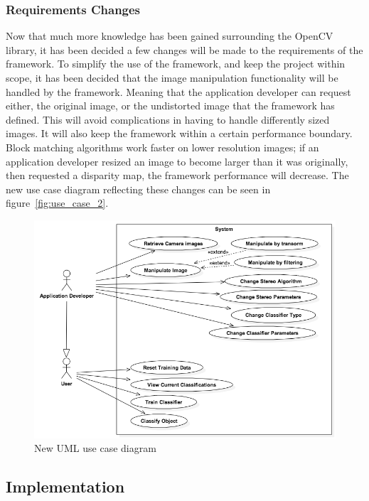 \documentclass[11pt,oneside]{report}
\begin{document}
		\subsubsection{Requirements Changes}
			Now that much more knowledge has been gained surrounding the OpenCV library, it has been decided a few changes will be made to the requirements of the framework.
			To simplify the use of the framework, and keep the project within scope, it has been decided that the image manipulation functionality will be handled by the framework.
			Meaning that the application developer can request either, the original image, or the undistorted image that the framework has defined.
			This will avoid complications in having to handle differently sized images.
			It will also keep the framework within a certain performance boundary.
			Block matching algorithms work faster on lower resolution images; if an application developer resized an image to become larger than it was originally, then requested a disparity map, the framework performance will decrease.
			The new use case diagram reflecting these changes can be seen in figure~\ref{fig:use_case_2}.
			
			\begin{figure}[ht]
			\begin{center}
    				\includegraphics[width=\textwidth]{use_case_2}
    			\caption{New UML use case diagram \protect {\label{fig:use_case_2}}}
    			\end{center}
			\end{figure}	
		\subsection{Implementation}
\end{document}
